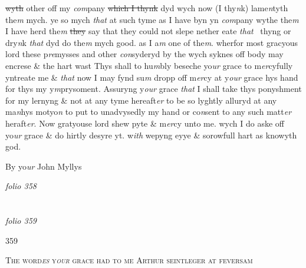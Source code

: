 \documentclass[12pt, a4paper]{book}
\begin{document}
               \sout{wyth}
other off my \textit{com}pany \sout{which I thynk} dyd wych now (I thy\textit{n}k) lame\textit{n}tyth
the\textit{m} mych. ye so mych \textit{that} at such tyme as I have byn yn \textit{com}pany wythe
the\textit{m} I have herd the\textit{m}
               \sout{they }say that they could not slepe nether eate \textit{that} 
thyng or dry\textit{n}k \textit{that }dyd do the\textit{m} mych good. as I a\textit{m} one of the\textit{m}. wherfor
most gracyous lord these p\textit{re}mysses and other \textit{con}syderyd by the wych syknes off
body may encrese \& the hart wast Thys shall to hu\textit{m}bly beseche yo\textit{ur
} grace to m\textit{er}cyfully yntreate me \& \textit{that }now I may fynd su\textit{m} dropp off m\textit{er}cy
at y\textit{our} grace hys hand for thys my y\textit{m}prysoment. Assuryng y\textit{our} grace
\textit{that} I shall take thys ponyshment for my lernyng \& not at any tyme
hereaft\textit{er} to be so lyghtly alluryd at any ma\textit{n}hys motyo\textit{n} to put to 
unadvysedly my hand or co\textit{n}sent to any such matt\textit{er} heraft\textit{er}.
Now gratyouse lord shew pyte \& m\textit{er}cy unto me. wych I do
aske off yo\textit{ur }grace \& do hirtly desyre yt. w\textit{ith} wepyng eyye \& sorowfull 
hart as knowyth god.


		\ifthenelse{\isodd{\thepage}}
		{\reversemarginpar}
		{\normalmarginpar}
		By yo\textit{ur} John Myllys

\dotfill
						\newpage
{}

\textit{folio 358}


         \vspace*{4cm}
         
\dotfill
						  \section*{}  \subsection*{}

\textit{folio 359}



\begin{flushright}{\color{Mahogany}359}\end{flushright}

				\begin{center} \begin{large} {\scshape The word\textit{es} y\textit{our} grace had to me Arthur 
seintleger at feversam} \end{large} \end{center}
			
\end{document}
